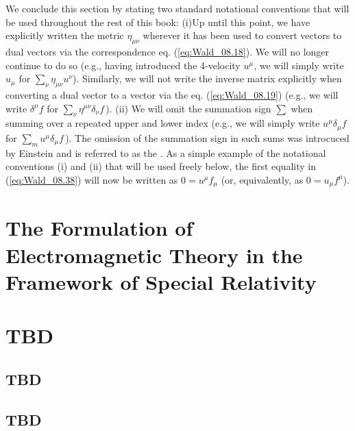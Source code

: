 We conclude this section by stating two standard notational conventions that will be used throughout the rest of this book: (i)Up until this point, we have explicitly written the metric $\eta_{\mu \nu}$ wherever it has been used to convert vectors to dual vectors via the correspondence eq. (\ref{eq:Wald_08.18}). We will no longer continue to do so (e.g., having introduced the 4-velocity $u^\mu$, we will simply write $u_\mu$ for $\sum_\nu \eta_{\mu \nu} u^\nu$). Similarly, we will not write the inverse matrix explicitly when converting a dual vector to a vector via the eq. (\ref{eq:Wald_08.19}) (e.g., we will write $\delta^\mu f$ for $\sum_\nu \eta^{\mu \nu} \delta_\nu f\,$). (ii) We will omit the summation sign $\sum$ when summing over a repeated upper and lower index (e.g., we will simply write $u^\mu \delta_\mu f$ for $\sum_m u^\mu \delta_\mu f\,$). The omission of the summation sign in such sums was introcuced by Einstein and is referred to as the . As a simple example of the notational conventions (i) and (ii) that will be used freely below, the first equality in (\ref{eq:Wald_08.38}) will now be written as $0 = u^\mu f_\mu$ (or, equivalently, as $0 = u_\mu f^\mu$). 

\section{The Formulation of Electromagnetic Theory in the Framework of Special Relativity}
\label{sec:Wald_08.2}


\section{TBD}
\label{sec:Wald_08.3}

\subsection{TBD}
\label{subsec:Wald_08.3.1}

\subsection{TBD}
\label{subsec:Wald_08.3.2}